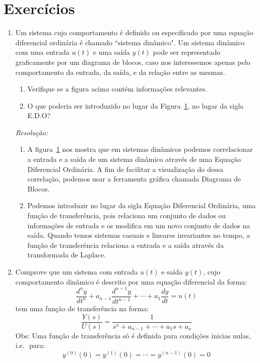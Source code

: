 \documentclass[12pt,a4paper]{article}
\begin{document}
\section*{Exercícios}
\begin{enumerate}
  \item  Um sistema cujo comportamento é definido ou especificado por uma equação 
    diferencial ordinária é chamado ``sistema dinâmico". Um sistema dinâmico com
    uma entrada $u(t)$ e uma saída $y(t)$ pode ser representado graficamente por
    um diagrama de blocos, caso nos interessemos apenas pelo comportamento da 
    entrada, da saída, e da relação entre as mesmas.
\begin{enumerate}[label=(\alph*)]
    \begin{figure}
      \label{fig:1}
    \end{figure}
  \item Verifique se a figura acima contém informações relevantes.
  \item O que poderia ser introduzido no lugar da Figura~\ref{fig:1}, no lugar 
    da sigla E.D.O?
\end{enumerate}

\emph{Resolução:}

\begin{enumerate}[label=(\alph*)]
  \item A figura~\ref{fig:1} nos mostra que em sistemas dinâmicos podemos 
    correlacionar a entrada e a saída de um sistema dinâmico através de uma 
    Equação Diferencial Ordinária. A fim de facilitar a visualização do 
    dessa correlação, podemos usar a ferramenta gráfica chamada Diagrama de 
    Blocos.
  \item Podemos introduzir no lugar da sigla Equação Diferencial Ordinária, uma 
    função de transferência, pois relaciona um conjunto de dados ou informações 
    de entrada e os modifica em um novo conjunto de dados na saída. Quando temos 
    sistemas casuais e  lineares invariantes no tempo, a função de transferência
    relaciona a entrada e a saída através da transformada de Laplace.
\end{enumerate}
\item Comprove que um sistema com entrada $u(t)$ e saída $y(t)$, cujo comportamento
  dinâmico é descrito por uma equação diferencial da forma:
  \begin{equation}
    \label{eq:1}
    \frac{d^{n}y}{dt^{n}}+a_{n-1}\frac{d^{n-1}y}{dt^{n-1}}+\cdots+a_1\frac{dy}{dt} =
    u(t)
  \end{equation}
  tem uma função de transferência na forma:
  \begin{equation}
    \label{eq:2}
    \frac{Y(s)}{U(s)}=\frac{1}{s^n + a_{n-1}+\cdots+a_1s+a_o}
  \end{equation}
  Obs: Uma função de transferência só é definida para condições inicias nulas, 
  i.e.\,\ para:
  \begin{equation}
    \label{eq:3}
    y^{(0)}(0)=y^{(1)}(0)=\cdots=y^{(n-1)}(0)=0
  \end{equation}


\end{enumerate}
\end{document}
